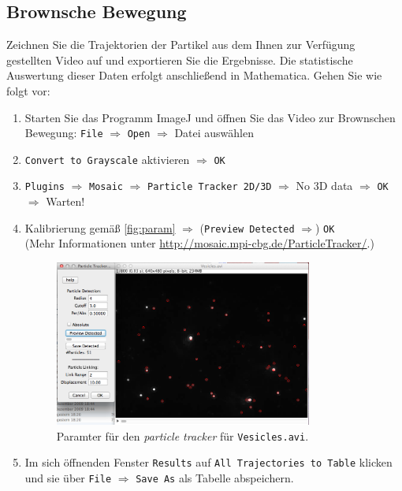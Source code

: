 \documentclass[a4paper,10pt]{article}
\begin{document}
\subsection{Brownsche Bewegung}
Zeichnen Sie die Trajektorien der Partikel aus dem Ihnen zur Verfügung gestellten Video auf und exportieren Sie die Ergebnisse. Die statistische Auswertung dieser Daten erfolgt anschließend in Mathematica. %
Gehen Sie wie folgt vor:
\begin{enumerate}
 \item Starten Sie das Programm ImageJ und öffnen Sie das Video zur Brownschen Bewegung: \texttt{File} $\Rightarrow$ \texttt{Open} $\Rightarrow$ Datei auswählen
 \item \texttt{Convert to Grayscale} aktivieren $\Rightarrow$ \texttt{OK}
 \item \texttt{Plugins} $\Rightarrow$ \texttt{Mosaic} $\Rightarrow$ \texttt{Particle Tracker 2D/3D} $\Rightarrow$ No 3D data $\Rightarrow$ \texttt{OK} $\Rightarrow$ Warten!
 \item Kalibrierung gemäß \autoref{fig:param} $\Rightarrow$ (\texttt{Preview Detected} $\Rightarrow$) \texttt{OK} \\
 {\footnotesize (Mehr Informationen unter \url{http://mosaic.mpi-cbg.de/ParticleTracker/}.)}
 
\begin{figure}[htbp]
  \centering
  \includegraphics[width=0.8\textwidth]{parameter.png}
  \caption{Paramter für den \textit{particle tracker} für \texttt{Vesicles.avi}.}
  \label{fig:param}
\end{figure}
 
 
 \item Im sich öffnenden Fenster \texttt{Results} auf \texttt{All Trajectories to Table} klicken und sie über \texttt{File} $\Rightarrow$ \texttt{Save As} als Tabelle abspeichern.%



\end{enumerate}
\end{document}
